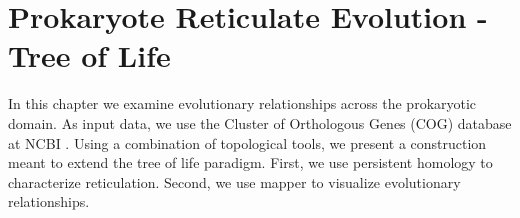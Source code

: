 \chapter{Prokaryote Reticulate Evolution - Tree of Life}
\label{ch:prokaryotes}

In this chapter we examine evolutionary relationships across the prokaryotic domain.
As input data, we use the Cluster of Orthologous Genes (COG) database at NCBI \cite{Galperin:2014ua}.
Using a combination of topological tools, we present a construction meant to extend the tree of life paradigm.
First, we use persistent homology to characterize reticulation.
Second, we use mapper to visualize evolutionary relationships.

\kje{[To Come.]}